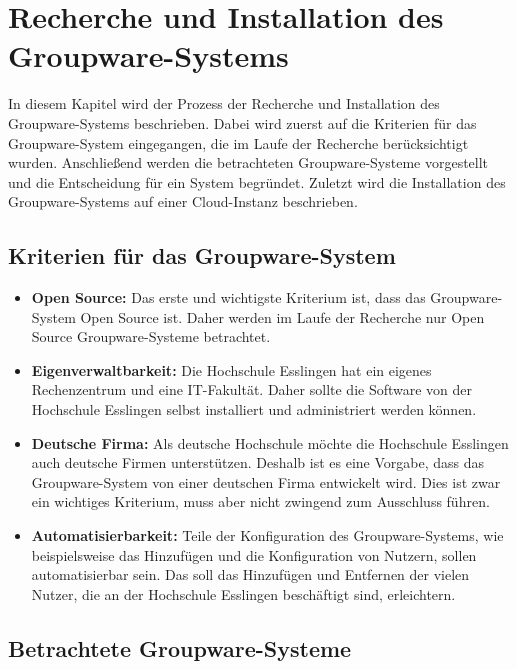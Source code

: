 \chapter{Recherche und Installation des Groupware-Systems}

In diesem Kapitel wird der Prozess der Recherche und Installation des Groupware-Systems beschrieben.
Dabei wird zuerst auf die Kriterien für das Groupware-System eingegangen, die im Laufe der Recherche berücksichtigt wurden.
Anschließend werden die betrachteten Groupware-Systeme vorgestellt und die Entscheidung für ein System begründet.
Zuletzt wird die Installation des Groupware-Systems auf einer Cloud-Instanz beschrieben.

\section{Kriterien für das Groupware-System}
\begin{itemize}
    \item \textbf{Open Source:} 
    Das erste und wichtigste Kriterium ist, dass das Groupware-System Open Source ist.
    Daher werden im Laufe der Recherche nur Open Source Groupware-Systeme betrachtet.
    \item \textbf{Eigenverwaltbarkeit:}
    Die Hochschule Esslingen hat ein eigenes Rechenzentrum und eine IT-Fakultät.
    Daher sollte die Software von der Hochschule Esslingen selbst installiert und administriert werden können.
    \item \textbf{Deutsche Firma:}
    Als deutsche Hochschule möchte die Hochschule Esslingen auch deutsche Firmen unterstützen.
    Deshalb ist es eine Vorgabe, dass das Groupware-System von einer deutschen Firma entwickelt wird.
    Dies ist zwar ein wichtiges Kriterium, muss aber nicht zwingend zum Ausschluss führen.
    \item \textbf{Automatisierbarkeit:}
    Teile der Konfiguration des Groupware-Systems, wie beispielsweise das Hinzufügen und die Konfiguration von Nutzern, sollen automatisierbar sein.
    Das soll das Hinzufügen und Entfernen der vielen Nutzer, die an der Hochschule Esslingen beschäftigt sind, erleichtern.
\end{itemize}

\newpage

\section{Betrachtete Groupware-Systeme}

